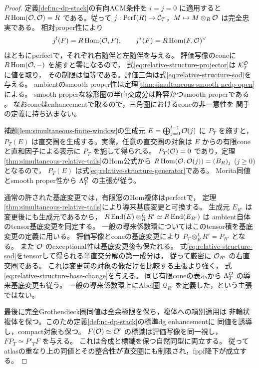 \begin{proof}
定義\ref{def:nc-dp-stack}の有向ACM条件を $i=j=0$ に適用すると
$R\operatorname{Hom}(\mathcal O,\mathcal O)=R$ である。従って
$j:\operatorname{Perf}(R)\to\mathcal C_T$，$M\mapsto M\otimes_R\mathcal O$ は完全忠実である。
相対proper性により
\[
 j^!(F)=R\operatorname{Hom}(\mathcal O,F),\qquad
 j^*(F)=R\operatorname{Hom}(F,\mathcal O)^\vee
\]
はともにperfectで，それぞれ右随伴と左随伴を与える。
評価写像のconeに $R\operatorname{Hom}(\mathcal O,-)$ を施すと零になるので，
式\eqref{eq:relative-structure-projector}は $\mathcal K_T^{\mathcal O}$ に値を取り，
その制限は恒等である。評価三角は式\eqref{eq:relative-structure-sod}を与える。
ambientのsmooth proper性は定理\ref{thm:simultaneous-smooth-ncdp-open}による。
smooth properな線形圏の半直交成分は許容かつsmooth properである
\cite[補題4.15(4)]{Perry2019HPD}。
なおconeはenhancementで取るので，三角圏におけるconeの非一意性を
関手の定義に持ち込まない。

補題\ref{lem:simultaneous-finite-window}の生成元
$E=\bigoplus_{j=0}^{l-1}\mathcal O(j)$ に $P_T$ を施すと，
$P_T(E)$ は直交圏を生成する。実際，任意の直交圏の対象は
$E$ からの有限coneと直和因子による表示に $P_T$ を施して得られる。
$P_T(\mathcal O)=0$ であり，定理\ref{thm:simultaneous-relative-tails}のHom公式から
$R\operatorname{Hom}(\mathcal O,\mathcal O(j))=(B_R)_j$ ($j\ge0$) となるので，
$P_T(E)$ は式\eqref{eq:relative-structure-generator}である。
Morita同値とsmooth proper性から $\Lambda_T^{\mathcal O}$ の主張が従う。

通常の許された基底変更では，有限窓のHom複体はperfectで，
定理\ref{thm:simultaneous-relative-tails}により導来基底変更と可換する。
生成元 $E_{R'}$ は変更後にも生成元であるから，
$R\operatorname{End}(E)\otimes_R^LR'\simeq R\operatorname{End}(E_{R'})$ は
ambient自体のtensor基底変更を同定する。
一般の導来係数環についてはこのtensor積を基底変更の定義に用いる。
評価写像とconeの基底変更により $P_T\otimes_R^LR'=P_{R'}$ となる。
また $\mathcal O$ のexceptional性は基底変更後も保たれる。
式\eqref{eq:relative-structure-sod}をtensorして得られる半直交分解の第一成分は，
従って厳密に $\mathcal O_{R'}$ の右直交圏である。
これは変更前の対象の像だけを比較する主張より強く，
式\eqref{eq:relative-structure-base-change}を与える。
同じ有限coneの表示から $\Lambda_T^{\mathcal O}$ の導来基底変更も従う。
一般の導来係数環上にAbel圏 $\mathcal Q_{R'}$ を定義した，という主張ではない。

最後に完全Grothendieck圏同値は全余極限を保ち，複体への項別適用は
非輪状複体を保つ。このため定義\ref{def:nc-dp-stack}の標準dg enhancementに
同値を誘導し，compact対象も保つ。
$F(\mathcal O)\simeq\mathcal O'$ の標識は評価写像を同一視し，
$F P_T\simeq P'_T F$ を与える。
これは合成と標識を保つ自然同型に両立する。
従ってatlasの重なり上の同値とその整合性が直交圏にも制限され，fppf降下が成立する。
\end{proof}

